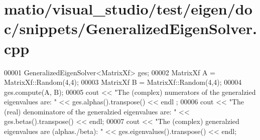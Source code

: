 \hypertarget{matio_2visual__studio_2test_2eigen_2doc_2snippets_2_generalized_eigen_solver_8cpp_source}{}\section{matio/visual\+\_\+studio/test/eigen/doc/snippets/\+Generalized\+Eigen\+Solver.cpp}
\label{matio_2visual__studio_2test_2eigen_2doc_2snippets_2_generalized_eigen_solver_8cpp_source}

\begin{DoxyCode}
00001 GeneralizedEigenSolver<MatrixXf> ges;
00002 MatrixXf A = MatrixXf::Random(4,4);
00003 MatrixXf B = MatrixXf::Random(4,4);
00004 ges.compute(A, B);
00005 cout << \textcolor{stringliteral}{"The (complex) numerators of the generalzied eigenvalues are: "} << ges.alphas().transpose() << endl
      ;
00006 cout << \textcolor{stringliteral}{"The (real) denominatore of the generalzied eigenvalues are: "} << ges.betas().transpose() << endl;
00007 cout << \textcolor{stringliteral}{"The (complex) generalzied eigenvalues are (alphas./beta): "} << ges.eigenvalues().transpose() << 
      endl;
\end{DoxyCode}
